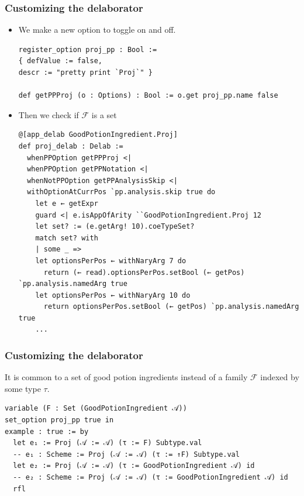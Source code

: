 \documentclass[9pt]{beamer}
\begin{document}
\begin{frame}[fragile]
\frametitle{Customizing the delaborator}
\begin{itemize}
  \item We make a new option to toggle on and off.
\begin{lstlisting}
register_option proj_pp : Bool :=
{ defValue := false,
descr := "pretty print `Proj`" }

def getPPProj (o : Options) : Bool := o.get proj_pp.name false

\end{lstlisting}

\item Then we check if $\mathscr{F}$ is a set
\begin{lstlisting}[basicstyle=\ttfamily\footnotesize]
@[app_delab GoodPotionIngredient.Proj]
def proj_delab : Delab :=
  whenPPOption getPPProj <|
  whenPPOption getPPNotation <|
  whenNotPPOption getPPAnalysisSkip <|
  withOptionAtCurrPos `pp.analysis.skip true do
    let e ← getExpr
    guard <| e.isAppOfArity ``GoodPotionIngredient.Proj 12
    let set? := (e.getArg! 10).coeTypeSet?
    match set? with
    | some _ =>
    let optionsPerPos ← withNaryArg 7 do
      return (← read).optionsPerPos.setBool (← getPos) `pp.analysis.namedArg true
    let optionsPerPos ← withNaryArg 10 do
      return optionsPerPos.setBool (← getPos) `pp.analysis.namedArg true
    ...
\end{lstlisting}
\end{itemize}
\end{frame}



\begin{frame}[fragile]
\frametitle{Customizing the delaborator}
It is common to a set of good potion ingredients instead of a family $\mathscr{F}$ indexed by some type $\tau$.
\begin{lstlisting}
variable (F : Set (GoodPotionIngredient 𝒜))
set_option proj_pp true in
example : true := by
  let e₁ := Proj (𝒜 := 𝒜) (τ := F) Subtype.val
  -- e₁ : Scheme := Proj (𝒜 := 𝒜) (τ := ↑F) Subtype.val
  let e₂ := Proj (𝒜 := 𝒜) (τ := GoodPotionIngredient 𝒜) id
  -- e₂ : Scheme := Proj (𝒜 := 𝒜) (τ := GoodPotionIngredient 𝒜) id
  rfl
\end{lstlisting}
\end{frame}
\end{document}
